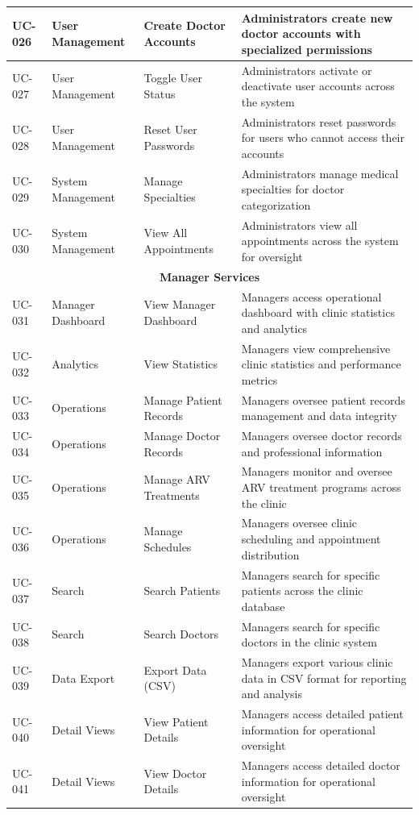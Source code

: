 \documentclass[12pt,a4paper]{article}
\begin{document}
\begin{longtable}{|p{1cm}|p{3cm}|p{3cm}|p{7cm}|}
\hline
UC-026 & User Management & Create Doctor Accounts & Administrators create new doctor accounts with specialized permissions \\
\hline
UC-027 & User Management & Toggle User Status & Administrators activate or deactivate user accounts across the system \\
\hline
UC-028 & User Management & Reset User Passwords & Administrators reset passwords for users who cannot access their accounts \\
\hline
UC-029 & System Management & Manage Specialties & Administrators manage medical specialties for doctor categorization \\
\hline
UC-030 & System Management & View All Appointments & Administrators view all appointments across the system for oversight \\
\hline
\multicolumn{4}{|c|}{\textbf{Manager Services}} \\
\hline
UC-031 & Manager Dashboard & View Manager Dashboard & Managers access operational dashboard with clinic statistics and analytics \\
\hline
UC-032 & Analytics & View Statistics & Managers view comprehensive clinic statistics and performance metrics \\
\hline
UC-033 & Operations & Manage Patient Records & Managers oversee patient records management and data integrity \\
\hline
UC-034 & Operations & Manage Doctor Records & Managers oversee doctor records and professional information \\
\hline
UC-035 & Operations & Manage ARV Treatments & Managers monitor and oversee ARV treatment programs across the clinic \\
\hline
UC-036 & Operations & Manage Schedules & Managers oversee clinic scheduling and appointment distribution \\
\hline
UC-037 & Search & Search Patients & Managers search for specific patients across the clinic database \\
\hline
UC-038 & Search & Search Doctors & Managers search for specific doctors in the clinic system \\
\hline
UC-039 & Data Export & Export Data (CSV) & Managers export various clinic data in CSV format for reporting and analysis \\
\hline
UC-040 & Detail Views & View Patient Details & Managers access detailed patient information for operational oversight \\
\hline
UC-041 & Detail Views & View Doctor Details & Managers access detailed doctor information for operational oversight \\

\end{longtable}
\end{document}
